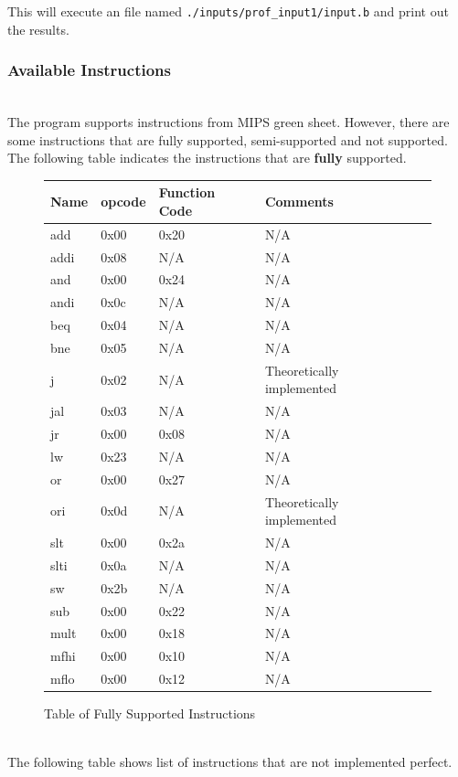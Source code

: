 \documentclass{homework}
\begin{document}
This will execute an file named \texttt{./inputs/prof_input1/input.b} and print out the results.


\pagebreak
\subsubsection{Available Instructions}
\\
The program supports instructions from MIPS green sheet. However, there are some instructions that are fully supported, semi-supported and not supported. The following table indicates the instructions that are \textbf{fully} supported.

\begin{figure}[h]
\begin{center}
\begin{tabular}{|l|l|l|l|l|}
    \hline
        \textbf{Name} & \textbf{opcode} & \textbf{Function Code} & \textbf{Comments}\\
    \hline
        add & 0x00 & 0x20 & N/A\\
        addi & 0x08 & N/A & N/A\\
        and & 0x00 & 0x24 & N/A\\
        andi & 0x0c & N/A & N/A\\
        beq & 0x04 & N/A & N/A\\
        bne & 0x05 & N/A & N/A\\
        j & 0x02 & N/A & Theoretically implemented\\
        jal & 0x03 & N/A & N/A\\
        jr & 0x00 & 0x08 & N/A\\
        lw & 0x23 & N/A & N/A\\
        or & 0x00 & 0x27 & N/A\\
        ori & 0x0d & N/A & Theoretically implemented\\
        slt & 0x00 & 0x2a & N/A\\
        slti & 0x0a & N/A & N/A\\
        sw & 0x2b & N/A & N/A\\
        sub & 0x00 & 0x22 & N/A\\
        mult & 0x00 & 0x18 & N/A\\
        mfhi & 0x00 & 0x10 & N/A\\
        mflo & 0x00 & 0x12 & N/A\\
    \hline
\end{tabular}
\caption{Table of Fully Supported Instructions}
\end{center}
\end{figure}
\\
The following table shows list of instructions that are not implemented perfect. 
\end{document}
